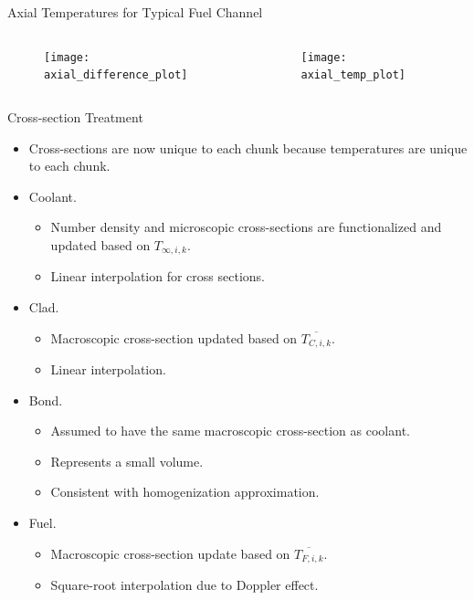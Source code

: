\begin{frame}{Axial Temperatures for Typical Fuel Channel}
  \begin{columns}
    \begin{column}{0.5\textwidth}
      \begin{figure}
        \centering
        \texttt{[image: axial\_difference\_plot]}
        \label{fig:axial_difference_plot}
      \end{figure}
    \end{column}
    \begin{column}{0.5\textwidth}
      \begin{figure}
        \centering
        \texttt{[image: axial\_temp\_plot]}
        \label{fig:axial_temp_plot}
      \end{figure}
    \end{column}
  \end{columns}
\end{frame}

\begin{frame}{Cross-section Treatment}
  \begin{itemize}
    \item Cross-sections are now unique to each chunk because temperatures are
      unique to each chunk.
    \item Coolant. 
      \begin{itemize}
        \item Number density and microscopic cross-sections are functionalized 
          and updated based on $T_{\infty,i,k}$.
        \item Linear interpolation for cross sections.
      \end{itemize}
    \item Clad. 
      \begin{itemize}
        \item Macroscopic cross-section updated based on $\overline{T_{C,i,k}}$.
        \item Linear interpolation.
      \end{itemize}
    \item Bond.
      \begin{itemize}
        \item Assumed to have the same macroscopic cross-section as coolant.
        \item Represents a small volume.
        \item Consistent with homogenization approximation.
      \end{itemize}
    \item Fuel.
      \begin{itemize}
        \item Macroscopic cross-section update based on $\overline{T_{F,i,k}}$.
        \item Square-root interpolation due to Doppler effect.
      \end{itemize}
  \end{itemize}
\end{frame}

